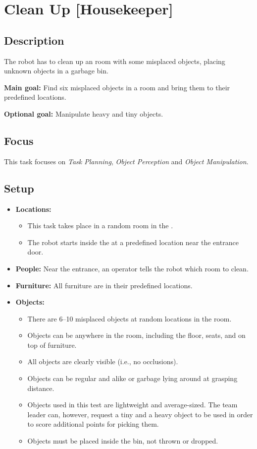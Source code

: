 \section{Clean Up [Housekeeper]}
\label{test:clean-up}

\subsection*{Description}
	The robot has to clean up an \Arena{} room with some misplaced objects, placing unknown objects in a garbage bin.

\textbf{Main goal:}
	Find six misplaced objects in a room and bring them to their predefined locations.

\textbf{Optional goal:}
	Manipulate heavy and tiny objects.

\subsection*{Focus}
	This task focuses on 
	\textit{Task Planning},
	\textit{Object Perception} and
	\textit{Object Manipulation}.

\subsection*{Setup}
\begin{itemize}[nosep]	
	\item \textbf{Locations:} 
		\begin{itemize}
			\item This task takes place in a random room in the \Arena{}.
			\item The robot starts inside the \Arena{} at a predefined location near the entrance door.
		\end{itemize}
	\item \textbf{People:} Near the entrance, an operator tells the robot which room to clean.
	\item \textbf{Furniture:} All furniture are in their predefined locations.
	\item \textbf{Objects:} 
		\begin{itemize}
			\item There are 6--10 misplaced objects at random locations in the room.
			\item Objects can be anywhere in the room, including the floor, seats, and on top of furniture.
			\item All objects are clearly visible (i.e., no occlusions).
			\item Objects can be regular and alike or garbage lying around at grasping distance.
			\item Objects used in this test are lightweight and average-sized. The team leader can, however, request a tiny and a heavy object to be used in order to score additional points for picking them.
			\item Objects must be placed inside the bin, not thrown or dropped.
		\end{itemize}
\end{itemize}

